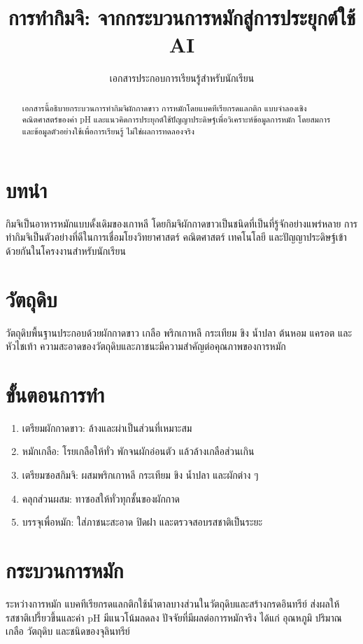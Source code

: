 \documentclass[12pt,a4paper]{article}
\title{\textbf{\color{kimchired}การทำกิมจิ: จากกระบวนการหมักสู่การประยุกต์ใช้ AI}}
\author{เอกสารประกอบการเรียนรู้สำหรับนักเรียน}
\date{}
\begin{document}
\maketitle
\begin{abstract}
เอกสารนี้อธิบายกระบวนการทำกิมจิผักกาดขาว การหมักโดยแบคทีเรียกรดแลกติก แบบจำลองเชิงคณิตศาสตร์ของค่า pH และแนวคิดการประยุกต์ใช้ปัญญาประดิษฐ์เพื่อวิเคราะห์ข้อมูลการหมัก โดยสมการและข้อมูลตัวอย่างใช้เพื่อการเรียนรู้ ไม่ใช่ผลการทดลองจริง
\end{abstract}
\tableofcontents
\newpage
\section{บทนำ}
กิมจิเป็นอาหารหมักแบบดั้งเดิมของเกาหลี โดยกิมจิผักกาดขาวเป็นชนิดที่เป็นที่รู้จักอย่างแพร่หลาย การทำกิมจิเป็นตัวอย่างที่ดีในการเชื่อมโยงวิทยาศาสตร์ คณิตศาสตร์ เทคโนโลยี และปัญญาประดิษฐ์เข้าด้วยกันในโครงงานสำหรับนักเรียน

\section{วัตถุดิบ}
วัตถุดิบพื้นฐานประกอบด้วยผักกาดขาว เกลือ พริกเกาหลี กระเทียม ขิง น้ำปลา ต้นหอม แครอต และหัวไชเท้า ความสะอาดของวัตถุดิบและภาชนะมีความสำคัญต่อคุณภาพของการหมัก

\section{ขั้นตอนการทำ}
\begin{enumerate}
\item เตรียมผักกาดขาว: ล้างและผ่าเป็นส่วนที่เหมาะสม
\item หมักเกลือ: โรยเกลือให้ทั่ว พักจนผักอ่อนตัว แล้วล้างเกลือส่วนเกิน
\item เตรียมซอสกิมจิ: ผสมพริกเกาหลี กระเทียม ขิง น้ำปลา และผักต่าง ๆ
\item คลุกส่วนผสม: ทาซอสให้ทั่วทุกชั้นของผักกาด
\item บรรจุเพื่อหมัก: ใส่ภาชนะสะอาด ปิดฝา และตรวจสอบรสชาติเป็นระยะ
\end{enumerate}

\section{กระบวนการหมัก}
ระหว่างการหมัก แบคทีเรียกรดแลกติกใช้น้ำตาลบางส่วนในวัตถุดิบและสร้างกรดอินทรีย์ ส่งผลให้รสชาติเปรี้ยวขึ้นและค่า pH มีแนวโน้มลดลง ปัจจัยที่มีผลต่อการหมักจริง ได้แก่ อุณหภูมิ ปริมาณเกลือ วัตถุดิบ และชนิดของจุลินทรีย์
\end{document}
